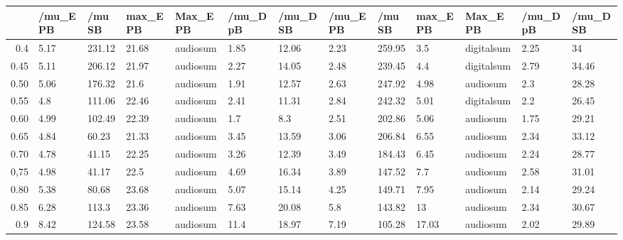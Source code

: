 \begin{table}[ht]
\centering
\begin{tabular}{rllllllllllll}
  \hline
 & /mu\_E PB & /mu SB & max\_E PB & Max\_E PB & /mu\_D pB & /mu\_D SB & /mu\_E PB & /mu SB & max\_E PB & Max\_E PB & /mu\_D pB & /mu\_D SB \\ 
  \hline
0.4 & 5.17 & 231.12 & 21.68 & audiosum & 1.85 & 12.06 & 2.23 & 259.95 & 3.5 & digitalsum & 2.25 & 34 \\ 
  0.45 & 5.11 & 206.12 & 21.97 & audiosum & 2.27 & 14.05 & 2.48 & 239.45 & 4.4 & digitalsum & 2.79 & 34.46 \\ 
  0.50 & 5.06 & 176.32 & 21.6 & audiosum & 1.91 & 12.57 & 2.63 & 247.92 & 4.98 & audiosum & 2.3 & 28.28 \\ 
  0.55 & 4.8 & 111.06 & 22.46 & audiosum & 2.41 & 11.31 & 2.84 & 242.32 & 5.01 & digitalsum & 2.2 & 26.45 \\ 
  0.60 & 4.99 & 102.49 & 22.39 & audiosum & 1.7 & 8.3 & 2.51 & 202.86 & 5.06 & audiosum & 1.75 & 29.21 \\ 
  0.65 & 4.84 & 60.23 & 21.33 & audiosum & 3.45 & 13.59 & 3.06 & 206.84 & 6.55 & audiosum & 2.34 & 33.12 \\ 
  0.70 & 4.78 & 41.15 & 22.25 & audiosum & 3.26 & 12.39 & 3.49 & 184.43 & 6.45 & audiosum & 2.24 & 28.77 \\ 
  0,75 & 4.98 & 41.17 & 22.5 & audiosum & 4.69 & 16.34 & 3.89 & 147.52 & 7.7 & audiosum & 2.58 & 31.01 \\ 
  0.80 & 5.38 & 80.68 & 23.68 & audiosum & 5.07 & 15.14 & 4.25 & 149.71 & 7.95 & audiosum & 2.14 & 29.24 \\ 
  0.85 & 6.28 & 113.3 & 23.36 & audiosum & 7.63 & 20.08 & 5.8 & 143.82 & 13 & audiosum & 2.34 & 30.67 \\ 
  0.9 & 8.42 & 124.58 & 23.58 & audiosum & 11.4 & 18.97 & 7.19 & 105.28 & 17.03 & audiosum & 2.02 & 29.89 \\ 
   \hline
\end{tabular}
\end{table}
